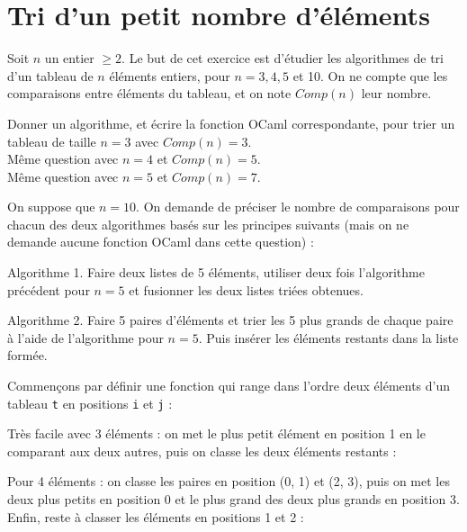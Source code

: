 \renewcommand{\SourceFile}{1-parcours-de-tableaux/src/1-5.ml}

\section{Tri d'un petit nombre d'éléments}

Soit $n$ un entier $\geq 2$. Le but de cet exercice est d'étudier les algorithmes de tri d'un tableau de $n$ éléments entiers, pour $n=3,4,5$ et 10. On ne compte que les comparaisons entre éléments du tableau, et on note $Comp(n)$ leur nombre.

\Q
Donner un algorithme, et écrire la fonction OCaml correspondante, pour trier un tableau de taille $n=3$ avec $Comp(n)=3$.\\
Même question avec $n=4$ et $Comp(n)=5$.\\
Même question avec $n=5$ et $Comp(n)=7$.

\Q
On suppose que $n=10$. On demande de préciser le nombre de comparaisons pour chacun des deux algorithmes basés sur les principes suivants (mais on ne demande aucune fonction OCaml dans cette question) :
\medskip

Algorithme 1. Faire deux listes de 5 éléments, utiliser deux fois l'algorithme précédent pour $n=5$ et fusionner les deux listes triées obtenues.
\medskip

Algorithme 2. Faire 5 paires d'éléments et trier les 5 plus grands de chaque paire à l'aide de l'algorithme pour $n=5$. Puis insérer les éléments restants dans la liste formée.

\Corrige
\vspace{.6cm}

Commençons par définir une fonction qui range dans l'ordre deux éléments d'un tableau \texttt{t} en positions \texttt{i} et \texttt{j} :



\Q
Très facile avec 3 éléments : on met le plus petit élément en position 1 en le comparant aux deux autres, puis on classe les deux éléments restants :



Pour 4 éléments : on classe les paires en position (0, 1) et (2, 3), puis on met les deux plus petits en position 0 et le plus grand des deux plus grands en position 3. Enfin, reste à classer les éléments en positions 1 et 2 :



